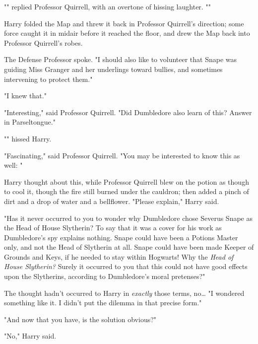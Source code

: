 "" replied Professor Quirrell, with an overtone of 
hissing laughter. ""

Harry folded the Map and threw it back in Professor Quirrell's direction; some 
force caught it in midair before it reached the floor, and drew the Map back 
into Professor Quirrell's robes.

The Defense Professor spoke. "I should also like to volunteer that Snape was 
guiding Miss Granger and her underlings toward bullies, and sometimes 
intervening to protect them."

"I knew that."

"Interesting," said Professor Quirrell. "Did Dumbledore also learn of this? 
Answer in Parseltongue."

"" hissed Harry.

"Fascinating," said Professor Quirrell. "You may be interested to know this as 
well: "

Harry thought about this, while Professor Quirrell blew on the potion as though 
to cool it, though the fire still burned under the cauldron; then added a pinch 
of dirt and a drop of water and a bellflower. "Please explain," Harry said.

"Has it never occurred to you to wonder why Dumbledore chose Severus Snape as 
the Head of House Slytherin? To say that it was a cover for his work as 
Dumbledore's spy explains nothing. Snape could have been a Potions Master only, 
and not the Head of Slytherin at all. Snape could have been made Keeper of 
Grounds and Keys, if he needed to stay within Hogwarts! Why the \emph{Head of 
House Slytherin?} Surely it occurred to you that this could not have good 
effects upon the Slytherins, according to Dumbledore's moral pretenses?"

The thought hadn't occurred to Harry in \emph{exactly} those terms, no{\ldots} 
"I wondered something like it. I didn't put the dilemma in that precise form."

"And now that you have, is the solution obvious?"

"No," Harry said.

